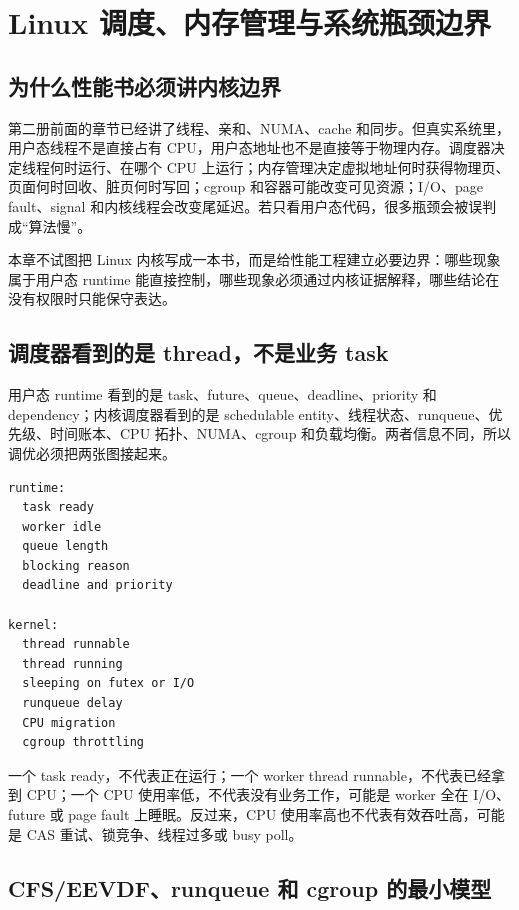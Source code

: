 \chapter{Linux 调度、内存管理与系统瓶颈边界}

\section{为什么性能书必须讲内核边界}

第二册前面的章节已经讲了线程、亲和、NUMA、cache 和同步。但真实系统里，用户态线程不是直接占有 CPU，用户态地址也不是直接等于物理内存。调度器决定线程何时运行、在哪个 CPU 上运行；内存管理决定虚拟地址何时获得物理页、页面何时回收、脏页何时写回；cgroup 和容器可能改变可见资源；I/O、page fault、signal 和内核线程会改变尾延迟。若只看用户态代码，很多瓶颈会被误判成“算法慢”。

本章不试图把 Linux 内核写成一本书，而是给性能工程建立必要边界：哪些现象属于用户态 runtime 能直接控制，哪些现象必须通过内核证据解释，哪些结论在没有权限时只能保守表达。

\section{调度器看到的是 thread，不是业务 task}

用户态 runtime 看到的是 task、future、queue、deadline、priority 和 dependency；内核调度器看到的是 schedulable entity、线程状态、runqueue、优先级、时间账本、CPU 拓扑、NUMA、cgroup 和负载均衡。两者信息不同，所以调优必须把两张图接起来。

\begin{lstlisting}[numbers=none,caption={用户态事实和内核事实的对应关系}]
runtime:
  task ready
  worker idle
  queue length
  blocking reason
  deadline and priority

kernel:
  thread runnable
  thread running
  sleeping on futex or I/O
  runqueue delay
  CPU migration
  cgroup throttling
\end{lstlisting}

一个 task ready，不代表正在运行；一个 worker thread runnable，不代表已经拿到 CPU；一个 CPU 使用率低，不代表没有业务工作，可能是 worker 全在 I/O、future 或 page fault 上睡眠。反过来，CPU 使用率高也不代表有效吞吐高，可能是 CAS 重试、锁竞争、线程过多或 busy poll。

\section{CFS/EEVDF、runqueue 和 cgroup 的最小模型}

